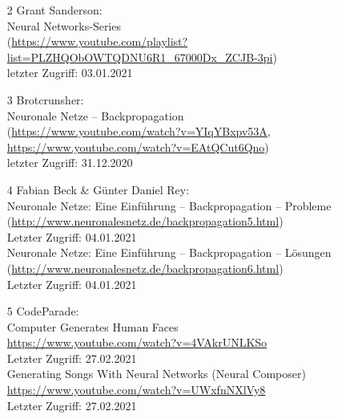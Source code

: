 \documentclass[11pt, a4paper, ngerman]{article}
\begin{document}
\begin{itemize}
	\item [2] \label{src:2} Grant Sanderson:\\[0.25ex]
	Neural Networks-Series\\
	(\href{https://www.youtube.com/playlist?list=PLZHQObOWTQDNU6R1\_67000Dx\_ZCJB-3pi}{https://www.youtube.com/playlist?list=PLZHQObOWTQDNU6R1\_67000Dx\_ZCJB-3pi})\\
	letzter Zugriff: 03.01.2021
	\item [3] \label{src:3} Brotcrunsher:\\[0.25ex]
	Neuronale Netze -- Backpropagation\\
	(\href{https://www.youtube.com/watch?v=YIqYBxpv53A}{https://www.youtube.com/watch?v=YIqYBxpv53A},\\
	\href{https://www.youtube.com/watch?v=EAtQCut6Qno}{https://www.youtube.com/watch?v=EAtQCut6Qno})\\
	letzter Zugriff: 31.12.2020
	\item [4] \label{src:4} Fabian Beck \& Günter Daniel Rey:\\[0.25ex]
	Neuronale Netze: Eine Einführung -- Backpropagation -- Probleme\\
	(\href{http://www.neuronalesnetz.de/backpropagation5.html}{http://www.neuronalesnetz.de/backpropagation5.html})\\
	Letzter Zugriff: 04.01.2021\\[0.25ex]
	Neuronale Netze: Eine Einführung -- Backpropagation -- Lösungen\\
	(\href{http://www.neuronalesnetz.de/backpropagation6.html}{http://www.neuronalesnetz.de/backpropagation6.html})\\
	Letzter Zugriff: 04.01.2021
	\item [5] \label{src:5} CodeParade:\\[0.25ex]
	Computer Generates Human Faces\\
	\href{https://www.youtube.com/watch?v=4VAkrUNLKSo}{https://www.youtube.com/watch?v=4VAkrUNLKSo}\\
	Letzter Zugriff: 27.02.2021\\[0.25ex]
	Generating Songs With Neural Networks (Neural Composer)\\
	\href{https://www.youtube.com/watch?v=UWxfnNXlVy8}{https://www.youtube.com/watch?v=UWxfnNXlVy8}\\
	Letzter Zugriff: 27.02.2021
\end{itemize}
\end{document}
